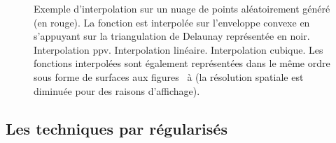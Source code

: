 \begin{figure}[t]
    \caption{Exemple d'interpolation sur un nuage de points aléatoirement généré (en rouge). La fonction est interpolée sur l'enveloppe convexe en s'appuyant sur la triangulation de Delaunay représentée en noir. \protect{} Interpolation \gls{ppv}. \protect{} Interpolation linéaire. \protect{} Interpolation cubique. Les fonctions interpolées sont également représentées dans le même ordre sous forme de surfaces aux figures~ à  (la résolution spatiale est diminuée pour des raisons d'affichage).
        \protect\label{fig-interpolation}}
\end{figure}


\subsection{Les techniques par  régularisés}\label{sec-MC-regul}

